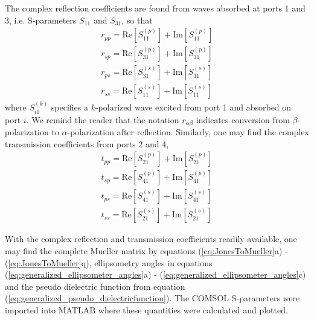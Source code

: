 The complex reflection coefficients are found from waves absorbed at ports 1 and 3, i.e. S-parameters $S_{11}$ and $S_{31}$, so that
\begin{subequations} 
\begin{align}
    r_{pp} = \text{Re}[S_{11}^{(p)}] + \text{Im}[S_{11}^{(p)}]  \\
    r_{sp} = \text{Re}[S_{31}^{(p)}] + \text{Im}[S_{31}^{(p)}]  \\
    r_{ps} = \text{Re}[S_{31}^{(s)}] + \text{Im}[S_{31}^{(s)}]  \\
    r_{ss} = \text{Re}[S_{11}^{(s)}] + \text{Im}[S_{11}^{(s)}]  
\end{align}
\end{subequations}
where $S_{i1}^{(k)}$ specifies a $k$-polarized wave excited from port 1 and absorbed on port $i$. We remind the reader that the notation $r_{\alpha\beta}$ indicates conversion from $\beta$-polarization to $\alpha$-polarization after reflection. Similarly, one may find the complex transmission coefficients from ports 2 and 4,
\begin{subequations} 
\begin{align}
    t_{pp} = \text{Re}[S_{21}^{(p)}] + \text{Im}[S_{21}^{(p)}]  \\
    t_{sp} = \text{Re}[S_{41}^{(p)}] + \text{Im}[S_{41}^{(p)}]  \\
    t_{ps} = \text{Re}[S_{41}^{(s)}] + \text{Im}[S_{41}^{(s)}]  \\
    t_{ss} = \text{Re}[S_{21}^{(s)}] + \text{Im}[S_{21}^{(s)}]  
\end{align}
\end{subequations}

With the complex reflection and transmission coefficients readily available, one may find the complete Mueller matrix by equations (\ref{eq:JonesToMueller}a) - (\ref{eq:JonesToMueller}q), ellipsometry angles in equations (\ref{eq:generalized_ellipsometer_angles}a) - (\ref{eq:generalized_ellipsometer_angles}c) and the pseudo dielectric function from equation (\ref{eq:generalized_pseudo_dielectricfunction}). The COMSOL S-parameters were imported into MATLAB where these quantities were calculated and plotted.

